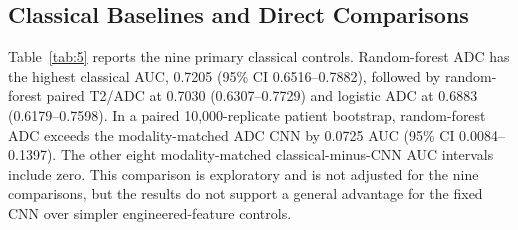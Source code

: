 \documentclass[11pt]{article}
\begin{document}
\subsection{Classical Baselines and Direct Comparisons}\label{sec:4.3}

Table~\ref{tab:5} reports the nine primary classical controls. Random-forest ADC has the highest classical AUC, 0.7205 (95\% CI 0.6516--0.7882), followed by random-forest paired T2/ADC at 0.7030 (0.6307--0.7729) and logistic ADC at 0.6883 (0.6179--0.7598). In a paired 10,000-replicate patient bootstrap, random-forest ADC exceeds the modality-matched ADC CNN by 0.0725 AUC (95\% CI 0.0084--0.1397). The other eight modality-matched classical-minus-CNN AUC intervals include zero. This comparison is exploratory and is not adjusted for the nine comparisons, but the results do not support a general advantage for the fixed CNN over simpler engineered-feature controls.

\begin{table}[htbp]
\centering
\scriptsize
\caption{Primary PROSTATEx classical controls using the same frozen patient-level folds. Confidence intervals use 2,000 patient-level bootstrap replicates. AP denotes average precision. Brier scores are reported for the raw model probabilities.}
\label{tab:5}
\end{table}
\end{document}
